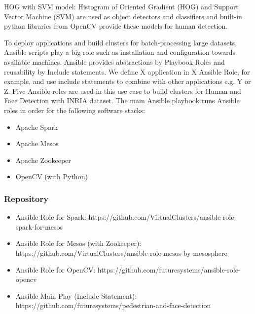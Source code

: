 HOG with SVM model: Histogram of Oriented Gradient (HOG) and Support Vector
Machine (SVM) are used as object detectors and classifiers and built-in python
libraries from OpenCV provide these models for human detection.

To deploy applications and build clusters for batch-processing large
datasets, Ansible scripts play a big role such as installation and
configuration towards available machines. Ansible provides abstractions by
Playbook Roles and reusability by Include statements. We define X application
in X Ansible Role, for example, and use include statements to combine with
other applications e.g. Y or Z. Five Ansible roles are used in this use case to
build clusters for Human and Face Detection with INRIA dataset. 
The main Ansible playbook runs Ansible roles in order for the following
software stacks:

\begin{itemize}
   \item Apache Spark 
   \item Apache Mesos
   \item Apache Zookeeper
   \item OpenCV (with Python)
\end{itemize}

\subsubsection{Repository}
\begin{itemize}

  \item Ansible Role for Spark: https://github.com/VirtualClusters/ansible-role-spark-for-mesos
  \item Ansible Role for Mesos (with Zookeeper): https://github.com/VirtualClusters/ansible-role-mesos-by-mesosphere
  \item Ansible Role for OpenCV: https://github.com/futuresystems/ansible-role-opencv
  \item Ansible Main Play (Include Statement): https://github.com/futuresystems/pedestrian-and-face-detection

\end{itemize}


